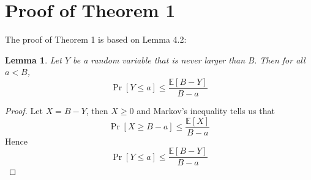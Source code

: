 \documentclass{article}
\newtheorem{lemma}{Lemma}
\begin{document}
\section{Proof of Theorem 1}
The proof of Theorem 1 is based on Lemma 4.2: 
\begin{lemma}
Let $Y$ be a random variable that is never larger than B. Then for all $a<B$,
\begin{equation}
\operatorname{Pr}[Y\leq a]\leq\frac{\mathbb{E}[B-Y]}{B-a}
\end{equation}
\end{lemma}
\begin{proof}
Let $X=B-Y$, then $X\geq 0$ and Markov's inequality tells us that
\begin{equation}
\operatorname{Pr}[X\geq B-a]\leq \frac{\mathbb{E}[X]}{B-a}
\end{equation}
Hence
\begin{equation}
\operatorname{Pr}[Y\leq a]\leq\frac{\mathbb{E}[B-Y]}{B-a}
\end{equation}
\end{proof}
\end{document}
